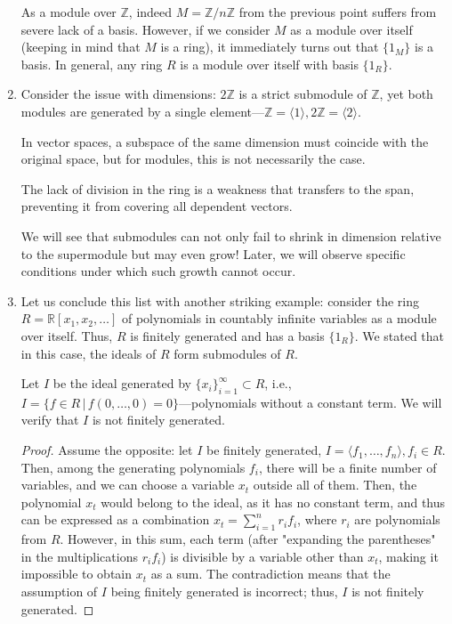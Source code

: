 \documentclass{article}
\newif\ifusemulticols
\theoremstyle{definition}
\theoremstyle{remark}
\theoremstyle{plain}
\theoremstyle{plain}
\newenvironment{mymulticols}
    { \ifusemulticols \begin{multicols}{2} \fi }
    { \ifusemulticols \end{multicols} \fi }
\newcommand{\Z}{\mathbb{Z}}
\begin{document}
\begin{mymulticols}
\begin{enumerate}
        As a module over $\Z$, indeed $M = \Z/n\Z$ from the previous point suffers from severe lack
        of a basis.
        However, if we consider $M$ as a module over itself (keeping in mind that $M$ is a ring), it
        immediately turns out that $\{1_M\}$ is a basis.
        In general, any ring $R$ is a module over itself with basis $\{1_R\}$.

    \item Consider the issue with dimensions: $2\Z$ is a strict submodule of $\Z$, yet both modules
        are generated by a single element—$\Z = \langle 1 \rangle, 2\Z = \langle 2 
        \rangle$.

        In vector spaces, a subspace of the same dimension must coincide with the original space,
        but for modules, this is not necessarily the case.

        The lack of division in the ring is a weakness that transfers to the span, preventing it from
        covering all dependent vectors.

        We will see that submodules can not only fail to shrink in dimension relative to the supermodule
        but may even grow! Later, we will observe specific conditions under which such growth cannot
        occur.
\item Let us conclude this list with another striking example: consider the ring $R =
        \mathbb{R}[x_1, x_2, \dots]$ of polynomials in countably infinite variables as a module over
        itself.
        Thus, $R$ is finitely generated and has a basis $\{1_R\}$.
        We stated that in this case, the ideals of $R$ form submodules of $R$.

        Let $I$ be the ideal generated by $\{x_i\}_{i=1}^\infty \subset R$, i.e., $I = \{f \in R \,
        | \, f(0, \ldots, 0) = 0\}$—polynomials without a constant term.
        We will verify that $I$ is not finitely generated.
        \begin{proof}
            Assume the opposite: let $I$ be finitely generated, $I = \langle f_1, \dots, f_n
            \rangle, f_i \in R$. Then, among the generating polynomials $f_i$, there will be a
            finite number of variables, and we can choose a variable $x_t$ outside all of them.
            Then, the polynomial $x_t$ would belong to the ideal, as it has no constant term, and
            thus can be expressed as a combination $x_t = \sum_{i=1}^n r_i f_i$, where $r_i$ are
            polynomials from $R$.
            However, in this sum, each term (after "expanding the parentheses" in the
            multiplications $r_i f_i$) is divisible by a variable other than $x_t$, making it
            impossible to obtain $x_t$ as a sum.
            The contradiction means that the assumption of $I$ being finitely generated is
            incorrect; thus, $I$ is not finitely generated.
        \end{proof}


\end{enumerate}
\end{mymulticols}
\end{document}
